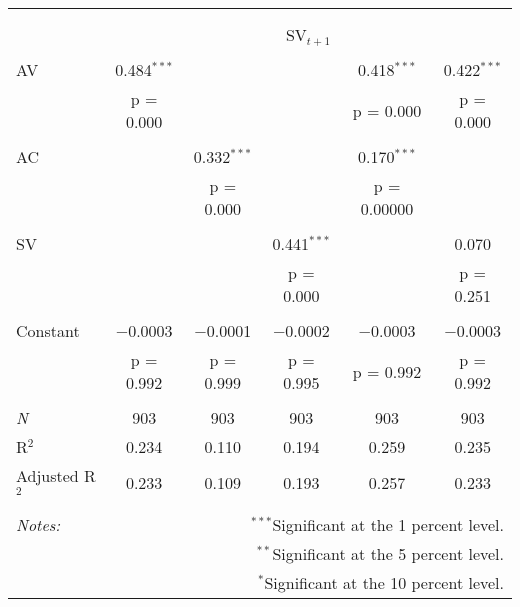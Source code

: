 
\begin{tabular}{@{\extracolsep{5pt}}lccccc} 
\\[-1.8ex]\hline 
\hline \\[-1.8ex] 
\\[-1.8ex] & \multicolumn{5}{c}{SV$_{t+1}$} \\ 
\hline \\[-1.8ex] 
 AV & 0.484$^{***}$ &  &  & 0.418$^{***}$ & 0.422$^{***}$ \\ 
  & p = 0.000 &  &  & p = 0.000 & p = 0.000 \\ 
  & & & & & \\ 
 AC &  & 0.332$^{***}$ &  & 0.170$^{***}$ &  \\ 
  &  & p = 0.000 &  & p = 0.00000 &  \\ 
  & & & & & \\ 
 SV &  &  & 0.441$^{***}$ &  & 0.070 \\ 
  &  &  & p = 0.000 &  & p = 0.251 \\ 
  & & & & & \\ 
 Constant & $-$0.0003 & $-$0.0001 & $-$0.0002 & $-$0.0003 & $-$0.0003 \\ 
  & p = 0.992 & p = 0.999 & p = 0.995 & p = 0.992 & p = 0.992 \\ 
  & & & & & \\ 
\textit{N} & 903 & 903 & 903 & 903 & 903 \\ 
R$^{2}$ & 0.234 & 0.110 & 0.194 & 0.259 & 0.235 \\ 
Adjusted R$^{2}$ & 0.233 & 0.109 & 0.193 & 0.257 & 0.233 \\ 
\hline 
\hline \\[-1.8ex] 
\textit{Notes:} & \multicolumn{5}{r}{$^{***}$Significant at the 1 percent level.} \\ 
 & \multicolumn{5}{r}{$^{**}$Significant at the 5 percent level.} \\ 
 & \multicolumn{5}{r}{$^{*}$Significant at the 10 percent level.} \\ 
\end{tabular} 
